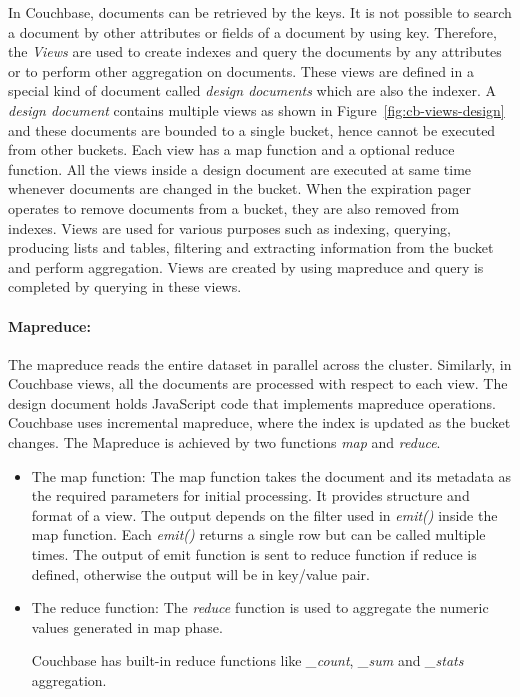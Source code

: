  In Couchbase, documents can be retrieved by the keys. It is not possible to search a document by other attributes or fields of a document by using key.  Therefore, the \textit{Views} are used to create indexes and query the documents by any attributes or to perform other aggregation on documents. These views are defined in a special kind of document called \textit{design documents} which are also the indexer. A \textit{design document} contains multiple views as shown in Figure~\ref{fig:cb-views-design} and these documents are bounded to a single bucket, hence cannot be executed from other buckets. Each view has a map function and a optional reduce function. All the views inside a design document are executed at same time whenever  documents are changed in the bucket. When the expiration pager operates to remove documents from a bucket, they are also removed from indexes. Views are used for various purposes such as indexing, querying, producing lists and tables, filtering and extracting information from the bucket and perform aggregation.  Views are created by using mapreduce and query is completed by querying in these views.
 
\paragraph{Mapreduce:} 
The mapreduce reads the entire dataset in parallel across the cluster. Similarly, in Couchbase views, all the documents are processed with respect to each view. The design document holds JavaScript code that implements mapreduce operations. Couchbase uses incremental mapreduce, where the index is updated as the bucket changes. The Mapreduce is achieved by two functions \textit{map} and \textit{reduce}. 
\begin{itemize}
\item {The map function:}
The map function takes the document and its metadata as the required parameters for initial processing. It provides structure and format of a view. The output depends on the filter used in \textit{emit()} inside  the map function. Each \textit{emit()}  returns a single row but can be called multiple times. The output of emit function is sent to reduce function if reduce is defined, otherwise the output will be in key/value pair. 

\item {The reduce function:}
The \textit{reduce} function is used to aggregate the numeric values generated in map phase.

Couchbase has built-in reduce functions like \textit{\_count}, \textit{\_sum} and \textit{\_stats} aggregation.

\end{itemize}

